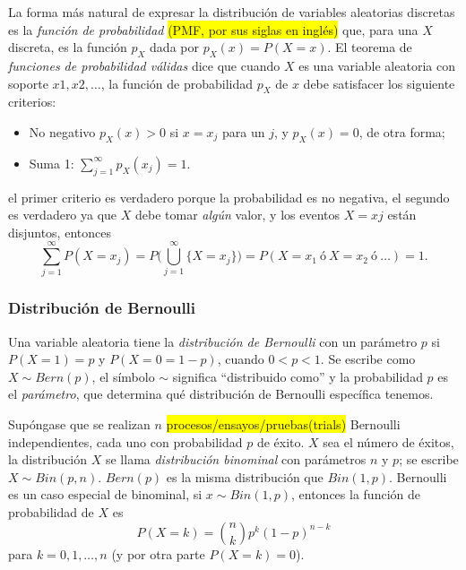 \documentclass[12pt,letterpaper]{article}
\begin{document}
La forma más natural de expresar la distribución de variables aleatorias discretas es la \emph{función de probabilidad}\cite{blitz19} \colorbox{yellow}{(PMF, por sus siglas en inglés)} que, para una $X$ discreta, es la función $p_X$ dada por $p_X(x)=P(X=x)$. El teorema de \emph{funciones de probabilidad válidas} dice que cuando $X$ es una variable aleatoria con soporte $x1,x2,\ldots$, la función de probabilidad $p_X$ de $x$ debe satisfacer los siguiente criterios:\begin{itemize}
    \item No negativo $p_X (x) > 0$ si $x=x_j$ para un $j$, y $p_X(x)=0$, de otra forma;
    \item Suma 1: $\sum_{j=1}^{\infty}p_X(x_j)=1$.
\end{itemize}
el primer criterio es verdadero porque la probabilidad es no negativa, el segundo es verdadero ya que $X$ debe tomar \emph{algún} valor, y los eventos ${X=xj}$ están disjuntos, entonces
\begin{equation}
\sum_{j=1}^{\infty}P(X=x_j)=P\bigg(\bigcup_{j=1}^{\infty}\{X=x_j\}\bigg)=P(X=x_1\ \text{ó}\ X=x_2\ \text{ó}\ \ldots)=1.
\end{equation}
\subsubsection {Distribución de Bernoulli}
Una variable aleatoria tiene la \emph{distribución de Bernoulli} con un parámetro $p$ si $P(X=1)=p$ y $P(X=0=1-p)$, cuando $0<p<1$. Se escribe como $X \sim Bern(p)$, el símbolo $\sim$ significa ``distribuido como'' y la probabilidad $p$ es el \emph{parámetro}, que determina qué distribución de Bernoulli específica tenemos.

Supóngase que se realizan $n$ \colorbox{yellow}{procesos/ensayos/pruebas(trials)} Bernoulli independientes, cada uno con probabilidad $p$ de éxito. $X$ sea el número de éxitos, la distribución $X$ se llama \emph{distribución binominal} con parámetros $n$ y $p$; se escribe $X \sim Bin(p,n)$.
$Bern(p)$ es la misma distribución que $Bin(1,p)$. Bernoulli es un caso especial de binominal, si $x \sim Bin(1,p)$, entonces la función de probabilidad de $X$ es
\begin{equation}
P(X=k)=\binom{n}{k}p^k(1-p)^{n-k}
\end{equation}
para $k=0,1,\ldots,n$ (y por otra parte $P(X=k)=0$).
\end{document}
